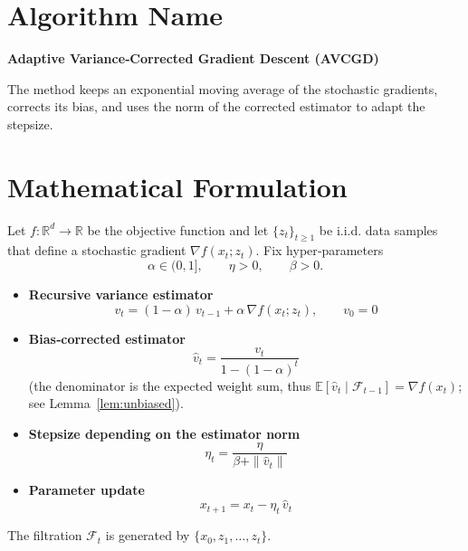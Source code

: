 \documentclass{article}
\newcommand{\E}{\mathbb{E}}
\newcommand{\R}{\mathbb{R}}
\begin{document}
\section*{Algorithm Name}
\textbf{Adaptive Variance‑Corrected Gradient Descent (AVCGD)}  

The method keeps an exponential moving average of the stochastic gradients,
corrects its bias, and uses the norm of the corrected estimator to
adapt the stepsize.

\section*{Mathematical Formulation}
Let $f:\R^{d}\rightarrow\R$ be the objective function and let
$\{z_{t}\}_{t\ge 1}$ be i.i.d. data samples that define a stochastic gradient
$\nabla f(x_{t};z_{t})$.  
Fix hyper‑parameters
\[
\alpha\in(0,1],\qquad \eta>0,\qquad \beta>0 .
\]

\begin{itemize}
  \item \textbf{Recursive variance estimator}
  \begin{equation}
    \boxed{ \; v_{t}= (1-\alpha)\,v_{t-1}+\alpha\,\nabla f(x_{t};z_{t}),\qquad v_{0}=0\; } \tag{1}
  \end{equation}
  \item \textbf{Bias‑corrected estimator}
  \begin{equation}
    \boxed{ \; \hat v_{t}= \frac{v_{t}}{1-(1-\alpha)^{t}} \; } \tag{2}
  \end{equation}
  (the denominator is the expected weight sum, thus $\E[\hat v_{t}\mid\mathcal F_{t-1}]
  =\nabla f(x_{t})$; see Lemma~\ref{lem:unbiased}).
  \item \textbf{Stepsize depending on the estimator norm}
  \begin{equation}
    \boxed{ \; \eta_{t}= \frac{\eta}{\beta+\|\hat v_{t}\|}\; } \tag{3}
  \end{equation}
  \item \textbf{Parameter update}
  \begin{equation}
    \boxed{ \; x_{t+1}=x_{t}-\eta_{t}\,\hat v_{t}\; } \tag{4}
  \end{equation}
\end{itemize}
The filtration $\mathcal F_{t}$ is generated by $\{x_{0},z_{1},\dots ,z_{t}\}$.

\end{document}
